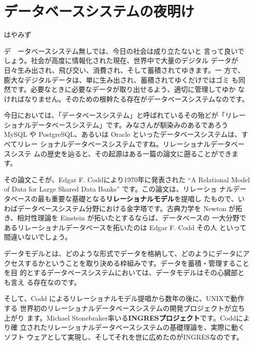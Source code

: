 

\cleardoublepage
\plainifnotempty


\chapter{データベースシステムの夜明け}


\begin{flushright}
はやみず
\end{flushright}


\lettrine{デ} \ \ ータベースシステム無しでは、今日の社会は成り立たないと
言って良いでしょう。社会が高度に情報化された現在、世界中で大量のデジタル
データが日々生み出され、飛び交い、消費され、そして蓄積されてゆきます。一
方で、膨大なデジタルデータは、単に生み出され、蓄積されてゆくだけではゴミ
も同然です。必要なときに必要なデータが取り出せるよう、適切に管理してゆか
なければなりません。そのための根幹たる存在がデータベースシステムなのです。


今日においては、「データベースシステム」と呼ばれているその殆どが「リレー
ショナルデータベースシステム」です。みなさんが馴染みのあるであろう MySQL
や PostgreSQL、あるいは Oracle といったデータベースシステムは、すべてリレー
ショナルデータベースシステムですね。リレーショナルデータベースシステ
ムの歴史を辿ると、その起源はある一篇の論文に遡ることができます。


その論文こそが、Edgar F.  Coddにより1970年に発表された ``A Relational
Model of Data for Large Shared Data Banks'' です。この論文は、リレーショ
ナルデータベースの最も重要な基礎となる{\bf リレーショナルモデル}を提唱し
たもので、いわばデータベースシステム分野における金字塔です。古典力学を
Newton が拓き、相対性理論を Einstein が拓いたとするならば、データベースの
一大分野であるリレーショナルデータベースを拓いたのは Edgar F. Codd その人
といって間違いないでしょう。


データモデルとは、どのような形式でデータを格納して、どのようにデータにア
クセスするかということを取り決める枠組みです。データを蓄積・管理することを目
的とするデータベースシステムにおいては、データモデルはその心臓部とも言え
る存在なのです。


そして、Codd によるリレーショナルモデル提唱から数年の後に、UNIXで動作する
世界初のリレーショナルデータベースシステムの開発プロジェクトが立ち上がり
ます。Michael Stonebraker率いる{\bf INGRESプロジェクト}です。Coddにより確
立されたリレーショナルデータベースシステムの基礎理論を、実際に動くソフト
ウェアとして実現し、そしてそれを世に広めたのがINGRESなのです。


